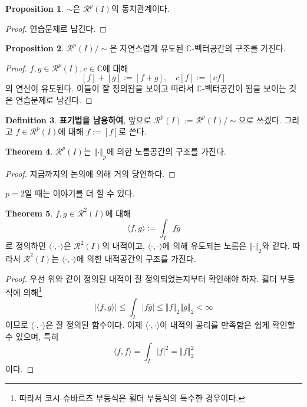 \documentclass[11pt]{book}
\numberwithin{equation}{chapter}
\def\CC{\mathbb{C}}
\def\calR{\mathcal{R}}
\newcommand{\inner}[2]{\langle#1, #2\rangle}
\newcommand{\abs}[1]{\left\vert#1\right\vert}
\newcommand{\norm}[1]{\left\Vert#1\right\Vert}
\theoremstyle{definition}
\newtheorem{thm}{Theorem}[section]
\newtheorem{prop}[thm]{Proposition}
\newtheorem{defn}[thm]{Definition}
\begin{document}
\begin{prop}
    \(\sim\)은 \(\calR^p(I)\)의 동치관계이다.
\end{prop}
\begin{proof}
    연습문제로 남긴다.
\end{proof}

\begin{prop}
    \(\calR^p(I) / \sim\)은 자연스럽게 유도된 \(\CC\)-벡터공간의 구조를 가진다.
\end{prop}
\begin{proof}
    \(f, g \in \calR^p(I), c \in \CC\)에 대해
    \[
        [f] + [g] := [f+g], \quad c[f] := [cf]
    \]
    의 연산이 유도된다. 이들이 잘 정의됨을 보이고 따라서 \(\CC\)-벡터공간이 됨을 보이는 것은 연습문제로 남긴다.
\end{proof}

\begin{defn}
    \textbf{표기법을 남용하여}, 앞으로 \(\calR^p(I) := \calR^p(I) / \sim\)으로 쓰겠다. 그리고 \(f \in \calR^p(I)\)에 대해 \(f := [f]\)로 쓴다.
\end{defn}

\begin{thm}
    \(\calR^p(I)\)는 \(\norm{\cdot}_p\)에 의한 노름공간의 구조를 가진다.
\end{thm}
\begin{proof}
    지금까지의 논의에 의해 거의 당연하다.
\end{proof}

\(p = 2\)일 때는 이야기를 더 할 수 있다.

\begin{thm}
    \(f, g \in \calR^2(I)\)에 대해
    \[
    \inner{f}{g} := \int_I f \overline{g}   
    \]
    로 정의하면 \(\inner{\cdot}{\cdot}\)은 \(\calR^2(I)\)의 내적이고, \(\inner{\cdot}{\cdot}\)에 의해 유도되는 노름은 \(\norm{\cdot}_2\)와 같다. 따라서 \(\calR^2(I)\)는 \(\inner{\cdot}{\cdot}\)에 의한 내적공간의 구조를 가진다.
\end{thm}
\begin{proof}
    우선 위와 같이 정의된 내적이 잘 정의되었는지부터 확인해야 하자. 횔더 부등식에 의해\footnote{따라서 코시-슈바르츠 부등식은 횔더 부등식의 특수한 경우이다.}
    \[
    \abs{\inner{f}{g}} \le \int_I \abs{f \overline{g}} \le \norm{f}_2 \norm{g}_2 < \infty    
    \]
    이므로 \(\inner{\cdot}{\cdot}\)은 잘 정의된 함수이다. 이제 \(\inner{\cdot}{\cdot}\)이 내적의 공리를 만족함은 쉽게 확인할 수 있으며, 특히
    \[
    \inner{f}{f} = \int_I \abs{f}^2 = \norm{f}_2^2    
    \]
    이다.
\end{proof}
\end{document}

